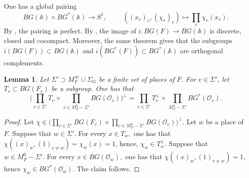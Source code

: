 \documentclass[a4paper,english,12pt]{amsart}
\newcommand{\GG}{ G}
\newcommand{\OO}{\mathcal O}
\newcommand{\Ov}{\mathcal O _v}
\newcommand{\AAA}{\mathbb A}
\newtheorem{lem}[equation]{Lemma}
\newtheorem{rem}[equation]{Remark}
\numberwithin{equation}{subsection}
\begin{document}
\subsubsection{}One has a global pairing $$BG(\AAA)\times BG^*(\AAA)\to S^1,\hspace{1cm}((x_v)_v,(\chi_v)_v)\mapsto \prod_{v}\chi_v(x_v).$$ By \cite[Page 56]{ArithmeticDuality}, the pairing is perfect. By \cite[Chapter I, Theorem 4.10]{ArithmeticDuality}, the image of $i:BG(F)\to BG(\AAA)$ is discrete, closed and cocompact. Moreover, the same theorem gives that the subgroups $i(BG(F))\subset BG(\AAA)$ and $i(BG^*(F))\subset BG^*(\AAA)$ are orthogonal complements.
\begin{lem}\label{smallemch}
Let $\Sigma '\supset M_F^\infty\cup \Sigma_G$ be a finite set of places of $F$. For $v\in\Sigma'$, let $T_v\subset BG(F_v)$ be a subgroup. One has that $$\bigg(\prod_{v\in \Sigma'}T_v\times\prod_{v\in M_F^0-\Sigma'}B\GG(\Ov)\bigg)^{\perp}=\prod_{v\in\Sigma'}T_v^{\perp}\times\prod_{M_F^0-\Sigma'}B\GG^*(\Ov).$$
\end{lem}
\begin{proof}
Let $\chi \in \bigg(\prod_{v\in \Sigma'}BG(F_v)\times\prod_{v\in M_F^0-\Sigma'}B\GG(\Ov)\bigg)^{\perp}$. Let $w$ be a place of $F.$ Suppose that $w\in \Sigma'$. For every $x\in T_w,$ one has that $\chi ((x)_w,(1)_{v\neq w})=\chi_w(x)=1$, hence, $\chi_w\in T_w^\perp$. Suppose that $w\in M_F^0-\Sigma'$. For every $x\in B\GG(\OO_w),$ one has that $\chi((x)_w,(1)_{v\neq w})=1$, hence $\chi_w\in B\GG^*(\OO_w)$. The claim follows.
\end{proof}
\end{document}
